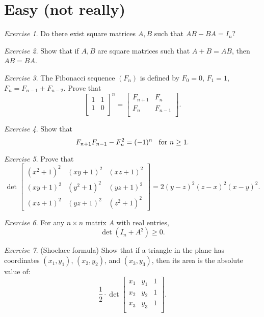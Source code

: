 \documentclass{article}
\theoremstyle{definition}
\theoremstyle{remark}
\newtheorem{exercise}{Exercise}
\begin{document}
\section{Easy (not really)}
\begin{exercise}
    Do there exist square matrices $A, B$ such that $AB - BA = I_{n}?$  
\end{exercise}

\begin{exercise}
    Show that if $A, B$ are square matrices such that $A + B = AB$, then $AB = BA$. 
\end{exercise}

\begin{exercise}
The Fibonacci sequence $(F_{n})$ is defined by $F_{0} = 0$, $F_{1} = 1$, $F_{n} = F_{n - 1} + F_{n - 2}$. Prove that 
\[\begin{bmatrix}
    1&1\\
    1&0\\
\end{bmatrix}^{n} = \begin{bmatrix}
    F_{n + 1}&F_{n}\\
    F_{n}&F_{n - 1}\\
    \end{bmatrix}.
\]
\end{exercise}

\begin{exercise}
Show that 
\[F_{n + 1}F_{n - 1} - F_{n}^{2} = (-1)^{n} \hspace*{3mm} \text{for } n \geq 1. 
\]
\end{exercise}

\begin{exercise}
Prove that 
\[
\det \begin{bmatrix}
(x^{2} + 1)^{2}&(xy + 1)^{2}&(xz + 1)^{2}\\
(xy + 1)^{2}&(y^{2} + 1)^{2}&(yz + 1)^{2}\\
(xz + 1)^{2}&(yz + 1)^{2}&(z^{2} + 1)^{2}
\end{bmatrix} = 2(y - z)^{2}(z - x)^{2}(x - y)^{2}.\]
\end{exercise}

\begin{exercise}
For any $n \times n$ matrix $A$ with real entries,
\[
\det(I_{n} + A^{2}) \geq 0.
\]
\end{exercise}

\begin{exercise}
(Shoelace formula) Show that if a triangle in the plane has coordinates $(x_{1}, y_{1})$, $(x_{2}, y_{2})$, and $(x_{3}, y_{3})$, then its area is the absolute value of:
\[\frac{1}{2} \cdot \det \begin{bmatrix}
x_{1}&y_{1}&1\\
x_{2}&y_{2}&1\\
x_{3}&y_{3}&1\\
\end{bmatrix}.
\]
\end{exercise}
\end{document}
